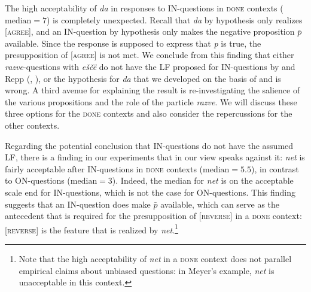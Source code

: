 \documentclass[output=paper,colorlinks,citecolor=brown]{langscibook}
\begin{document}
The high acceptability of \textit{da} in responses to IN-questions in \textsc{done} contexts ($\text{median}=7$) is completely unexpected. Recall that \textit{da} by hypothesis only realizes [\textsc{agree}], and an IN-question by hypothesis only makes the negative proposition $\bar{p}$ available. Since the response is supposed to express that \textit{p} is true, the presupposition of [\textsc{agree}] is not met. We conclude from this finding that either \textit{razve}-questions with \textit{eščë} do not have the LF proposed for IN-questions by \citet{RomeroHan2004} and Repp (\citeyear{Repp2006}, \citeyear{Repp2009}), or the hypothesis for \textit{da} that we developed on the basis of \citet{Esipova2021} and \citet{Gonzalez-FuenteTubauEspinalPrieto2015} is wrong. A third avenue for explaining the result is re-investigating the salience of the various propositions and the role of the particle \textit{razve}. We will discuss these three options for the \textsc{done} contexts and also consider the repercussions for the other contexts. 

Regarding the potential conclusion that IN-questions do not have the assumed LF, there is a finding in our experiments that in our view speaks against it: \textit{net} is fairly acceptable after IN-questions in \textsc{done} contexts ($\text{median}=5.5$), in contrast to ON-questions ($\text{median}=3$). Indeed, the median for \textit{net} is on the acceptable scale end for IN-questions, which is not the case for ON-questions. This finding suggests that an IN-question does make $\bar{p}$ available, which can serve as the antecedent that is required for the presupposition of [\textsc{reverse}] in a \textsc{done} context: [\textsc{reverse}] is the feature that is realized by \textit{net}.\footnote{Note that the high acceptability of \textit{net} in a \textsc{done} context does not parallel  empirical claims about unbiased questions: in Meyer’s example, \textit{net} is unacceptable in this context.}
\end{document}
